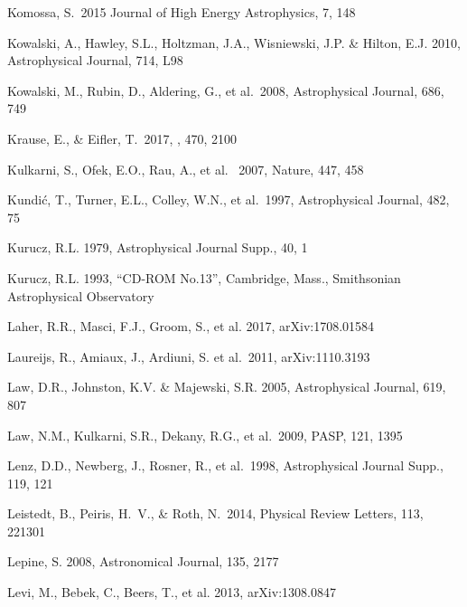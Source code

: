 \documentclass[twocolumn]{aastex61}
\begin{document}
\begin{thebibliography}{}
 Komossa, S.~2015 Journal of High Energy Astrophysics, 7, 148


 Kowalski, A., Hawley, S.L., Holtzman, J.A., Wisniewski, J.P. \& Hilton, E.J. 2010, Astrophysical Journal, 714, L98

 Kowalski, M., Rubin, D., Aldering, G., et al.~2008,  Astrophysical Journal, 686, 749

 Krause, E., \& Eifler, T.\ 2017, \mnras, 470, 2100

 Kulkarni, S., Ofek, E.O., Rau, A., et al.~ 2007, Nature, 447, 458

 Kundi\'{c}, T., Turner, E.L., Colley, W.N., et al.~1997, Astrophysical Journal, 482, 75

 Kurucz, R.L. 1979, Astrophysical Journal Supp., 40, 1

 Kurucz, R.L. 1993, ``CD-ROM No.13”, Cambridge, Mass., Smithsonian Astrophysical Observatory

 Laher, R.R., Masci, F.J., Groom, S., et al. 2017, arXiv:1708.01584

 Laureijs, R., Amiaux, J., Ardiuni, S. et al.~2011, arXiv:1110.3193

 Law, D.R., Johnston, K.V. \& Majewski, S.R. 2005,  Astrophysical Journal, 619, 807

 Law, N.M., Kulkarni, S.R., Dekany, R.G., et al.~2009, PASP, 121, 1395

 Lenz, D.D., Newberg, J., Rosner, R., et al.~1998, Astrophysical Journal Supp., 119, 121

 Leistedt, B., Peiris, H.~V., \& Roth, N.\ 2014, Physical Review Letters, 113, 221301

 Lepine, S. 2008, Astronomical Journal, 135, 2177

 Levi, M., Bebek, C., Beers, T., et al. 2013, arXiv:1308.0847


\end{thebibliography}
\end{document}
